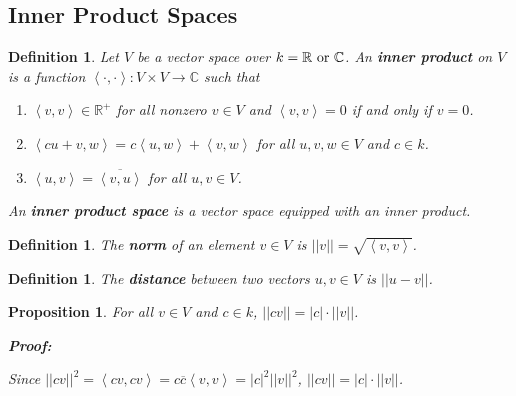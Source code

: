 \documentclass{article}
\theoremstyle{colontheorem}
\newtheorem{proposition}[theorem]{Proposition}
\newtheorem{definition}[theorem]{Definition}
\newenvironment{Proposition}
{
	\begin{mdframed}[backgroundcolor=TheoremOrange!10]
	\begin{proposition}
}
{
	\end{proposition}
	\end{mdframed}
	
	\vspace{.15in}
}
\newenvironment{Def}
{
	\begin{mdframed}[backgroundcolor=DefGreen!10]
	\begin{definition}
}
{
	\end{definition}
	\end{mdframed}
	
	\vspace{.15in}
}
\newenvironment{Proof}
{
	\begin{mdframed}[backgroundcolor=ProofPurple!10]
	\textbf{Proof:}%
}
{
	\end{mdframed}
	
	\vspace{.085in}
}
\begin{document}
\begin{center}
	\pagebreak
	
	\section{Inner Product Spaces}
	
	\vspace{.1in}
\end{center}



\begin{Def}
	
	Let $V$ be a vector space over $k = \mathbb{R}\ \textnormal{or}\ \mathbb{C}$. An \textbf{inner product} on $V$ is a function $\left< \cdot, \cdot \right> : V \times V \longrightarrow \mathbb{C}$ such that
	
	\begin{enumerate}
		
		\item $\left< v, v \right> \in \mathbb{R}^+$ for all nonzero $v \in V$ and $\left< v, v \right> = 0$ if and only if $v = 0$.
		\item $\left< cu + v, w \right> = c \left< u, w \right> + \left< v, w \right>$ for all $u, v, w \in V$ and $c \in k$.
		\item $\left< u, v \right> = \overline{\left< v, u \right>}$ for all $u, v \in V$.
		
	\end{enumerate}
	
	An \textbf{inner product space} is a vector space equipped with an inner product.
	
\end{Def}



\begin{Def}
	
	The \textbf{norm} of an element $v \in V$ is $||v|| = \sqrt{\left< v, v \right>}$.
	
\end{Def}



\begin{Def}
	
	The \textbf{distance} between two vectors $u, v \in V$ is $||u - v||$.
	
\end{Def}



\begin{Proposition}
	
	For all $v \in V$ and $c \in k$, $||cv|| = |c| \cdot ||v||$.
	
	\begin{Proof}
		Since $||cv||^2 = \left< cv, cv \right> = c \overline{c} \left< v, v \right> = |c|^2 ||v||^2$, $||cv|| = |c| \cdot ||v||$.
		
	\end{Proof}
	
\end{Proposition}
\end{document}
